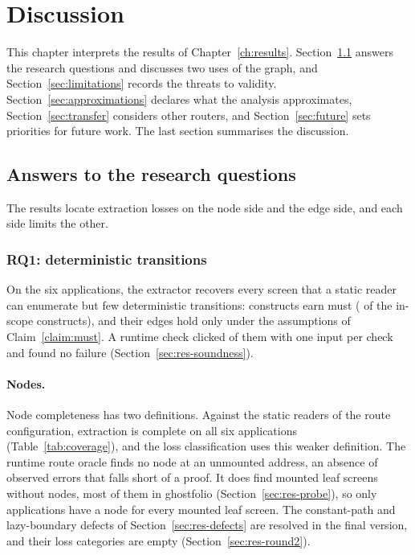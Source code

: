 \section{Discussion}
\label{ch:discussion}

This chapter interprets the results of Chapter~\ref{ch:results}. Section~\ref{sec:findings}
answers the research questions and discusses two uses of the graph, and
Section~\ref{sec:limitations} records the threats to validity. Section~\ref{sec:approximations}
declares what the analysis approximates, Section~\ref{sec:transfer} considers other routers, and
Section~\ref{sec:future} sets priorities for future work. The last section summarises the discussion.

\subsection{Answers to the research questions}
\label{sec:findings}

The results locate extraction losses on the node side and the edge side, and each side limits
the other.

\subsubsection{RQ1: deterministic transitions}
\label{sec:rq1}

On the six applications, the extractor recovers every screen that a static reader can enumerate
but few deterministic transitions: \CensusMustSites{} constructs earn must (\RoundTwoMustConv{} of
the in-scope constructs), and their edges hold only under the assumptions of Claim~\ref{claim:must}.
A runtime check clicked \MustRunConfirmedConstructs{} of them with one input per check and found no failure (Section~\ref{sec:res-soundness}).

\paragraph{Nodes.}
Node completeness has two definitions. Against the static readers of the route configuration,
extraction is complete on all six applications (Table~\ref{tab:coverage}), and the loss
classification uses this weaker definition. The runtime route oracle finds no node at an unmounted
address, an absence of observed errors that falls short of a proof. It does find mounted leaf screens without
nodes, most of them in ghostfolio (Section~\ref{sec:res-probe}), so only \ProbeExactApps{} applications
have a node for every mounted leaf screen. The constant-path and lazy-boundary defects of
Section~\ref{sec:res-defects} are resolved in the final version, and their loss categories are
empty (Section~\ref{sec:res-round2}).

